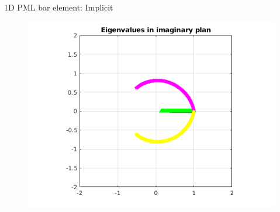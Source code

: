 \begin{frame}{1D PML bar element: Implicit}
\begin{figure}[ht] 
  \label{ fig7} 
  \begin{minipage}[b]{0.5\linewidth}
    \centering
    \includegraphics[scale=.35]{images/pml1d-imp-1.png} \\


\end{minipage}
\end{figure}
\end{frame}
